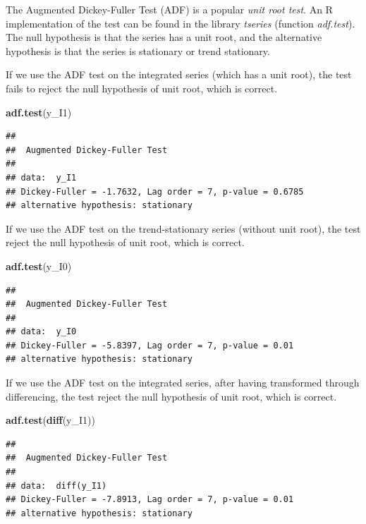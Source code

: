 \documentclass[
]{article}
\newenvironment{Shaded}{\begin{snugshade}}{\end{snugshade}}
\newcommand{\KeywordTok}[1]{\textcolor[rgb]{0.13,0.29,0.53}{\textbf{#1}}}
\newcommand{\NormalTok}[1]{#1}
\begin{document}
The Augmented Dickey-Fuller Test (ADF) is a popular \emph{unit root test}. An R implementation of the test can be found in the library \emph{tseries} (function \emph{adf.test}). The null hypothesis is that the series has a unit root, and the alternative hypothesis is that the series is stationary or trend stationary.

If we use the ADF test on the integrated series (which has a unit root), the test fails to reject the null hypothesis of unit root, which is correct.

\begin{Shaded}
\begin{Highlighting}[]
\KeywordTok{adf.test}\NormalTok{(y_I1)}
\end{Highlighting}
\end{Shaded}

\begin{verbatim}
## 
##  Augmented Dickey-Fuller Test
## 
## data:  y_I1
## Dickey-Fuller = -1.7632, Lag order = 7, p-value = 0.6785
## alternative hypothesis: stationary
\end{verbatim}

If we use the ADF test on the trend-stationary series (without unit root), the test reject the null hypothesis of unit root, which is correct.

\begin{Shaded}
\begin{Highlighting}[]
\KeywordTok{adf.test}\NormalTok{(y_I0)}
\end{Highlighting}
\end{Shaded}

\begin{verbatim}
## 
##  Augmented Dickey-Fuller Test
## 
## data:  y_I0
## Dickey-Fuller = -5.8397, Lag order = 7, p-value = 0.01
## alternative hypothesis: stationary
\end{verbatim}

If we use the ADF test on the integrated series, after having transformed through differencing, the test reject the null hypothesis of unit root, which is correct.

\begin{Shaded}
\begin{Highlighting}[]
\KeywordTok{adf.test}\NormalTok{(}\KeywordTok{diff}\NormalTok{(y_I1))}
\end{Highlighting}
\end{Shaded}

\begin{verbatim}
## 
##  Augmented Dickey-Fuller Test
## 
## data:  diff(y_I1)
## Dickey-Fuller = -7.8913, Lag order = 7, p-value = 0.01
## alternative hypothesis: stationary
\end{verbatim}
\end{document}
